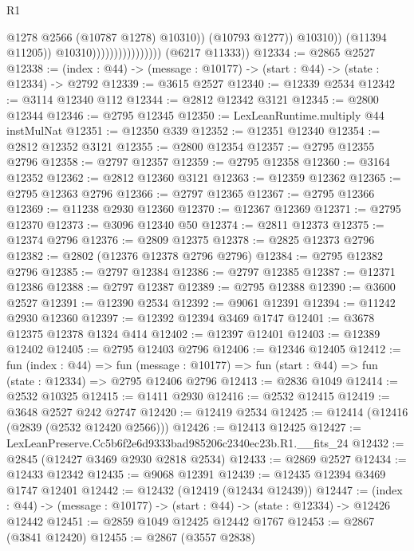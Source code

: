 \begin{lexlean}{R1}
\begin{coremodule}
                                                  @1278
                                                  @2566
                                                  (@10787 @1278)
                                                  @10310))
                                              (@10793 @1277))
                                            @10310))
                                        (@11394 @11205))
                                      @10310))))))))))))))))
      (@6217 @11333))
@12334 := @2865 @2527
@12338 := (index : @44) -> (message : @10177) -> (start : @44) -> (state : @12334) -> @2792
@12339 := @3615 @2527
@12340 := @12339 @2534
@12342 := @3114 @12340 @112
@12344 := @2812 @12342 @3121
@12345 := @2800 @12344
@12346 := @2795 @12345
@12350 := LexLeanRuntime.multiply @44 instMulNat
@12351 := @12350 @339
@12352 := @12351 @12340
@12354 := @2812 @12352 @3121
@12355 := @2800 @12354
@12357 := @2795 @12355 @2796
@12358 := @2797 @12357
@12359 := @2795 @12358
@12360 := @3164 @12352
@12362 := @2812 @12360 @3121
@12363 := @12359 @12362
@12365 := @2795 @12363 @2796
@12366 := @2797 @12365
@12367 := @2795 @12366
@12369 := @11238 @2930 @12360
@12370 := @12367 @12369
@12371 := @2795 @12370
@12373 := @3096 @12340 @50
@12374 := @2811 @12373
@12375 := @12374 @2796
@12376 := @2809 @12375
@12378 := @2825 @12373 @2796
@12382 := @2802 (@12376 @12378 @2796 @2796)
@12384 := @2795 @12382 @2796
@12385 := @2797 @12384
@12386 := @2797 @12385
@12387 := @12371 @12386
@12388 := @2797 @12387
@12389 := @2795 @12388
@12390 := @3600 @2527
@12391 := @12390 @2534
@12392 := @9061 @12391
@12394 := @11242 @2930 @12360
@12397 := @12392 @12394 @3469 @1747
@12401 := @3678 @12375 @12378 @1324 @414
@12402 := @12397 @12401
@12403 := @12389 @12402
@12405 := @2795 @12403 @2796
@12406 := @12346 @12405
@12412 := fun (index : @44) =>
  fun (message : @10177) => fun (start : @44) => fun (state : @12334) => @2795 @12406 @2796
@12413 := @2836 @1049
@12414 := @2532 @10325
@12415 := @1411 @2930
@12416 := @2532 @12415
@12419 := @3648 @2527 @242 @2747
@12420 := @12419 @2534
@12425 := @12414 (@12416 (@2839 (@2532 @12420 @2566)))
@12426 := @12413 @12425
@12427 := LexLeanPreserve.Cc5b6f2e6d9333bad985206c2340ec23b.R1.__fits_24
@12432 := @2845 (@12427 @3469 @2930 @2818 @2534)
@12433 := @2869 @2527
@12434 := @12433 @12342
@12435 := @9068 @12391
@12439 := @12435 @12394 @3469 @1747 @12401
@12442 := @12432 (@12419 (@12434 @12439))
@12447 := (index : @44) -> (message : @10177) -> (start : @44) -> (state : @12334) -> @12426 @12442
@12451 := @2859 @1049 @12425 @12442 @1767
@12453 := @2867 (@3841 @12420)
@12455 := @2867 (@3557 @2838)

\end{coremodule}
\end{lexlean}
